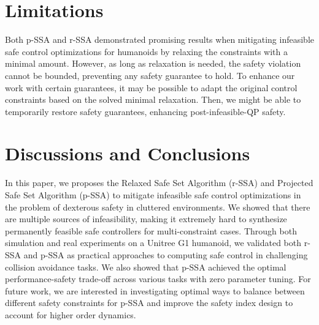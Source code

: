 \section{Limitations}
\label{sec:limitation}

Both p-SSA and r-SSA demonstrated promising results when mitigating infeasible safe control optimizations for humanoids by relaxing the constraints with a minimal amount.
However, as long as relaxation is needed, the safety violation cannot be bounded, preventing any safety guarantee to hold.
To enhance our work with certain guarantees, it may be possible to adapt the original control constraints based on the solved minimal relaxation.
Then, we might be able to temporarily restore safety guarantees, enhancing post-infeasible-QP safety.

\section{Discussions and Conclusions}
\label{sec:conclusion}

In this paper, we proposes the Relaxed Safe Set Algorithm (r-SSA) and Projected Safe Set Algorithm (p-SSA) to mitigate infeasible safe control optimizations in the problem of dexterous safety in cluttered environments.
We showed that there are multiple sources of infeasibility, making it extremely hard to synthesize permanently feasible safe controllers for multi-constraint cases.
Through both simulation and real experiments on a Unitree G1 humanoid, we validated both r-SSA and p-SSA as practical approaches to computing safe control in challenging collision avoidance tasks.
We also showed that p-SSA achieved the optimal performance-safety trade-off across various tasks with zero parameter tuning.
For future work, we are interested in investigating optimal ways to balance between different safety constraints for p-SSA and improve the safety index design to account for higher order dynamics.






